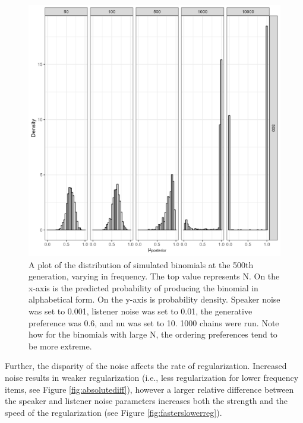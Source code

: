 \documentclass[10pt, letterpaper]{article}
\newenvironment{CodeChunk}{}{}
\begin{document}
\begin{CodeChunk}
\begin{figure}[tb]

{\centering \includegraphics[width=1\linewidth]{Figures/speaker_noise_001_listener_01} 

}

\caption[A plot of the distribution of simulated binomials at the 500th generation, varying in frequency]{A plot of the distribution of simulated binomials at the 500th generation, varying in frequency. The top value represents N. On the x-axis is the predicted probability of producing the binomial in alphabetical form. On the y-axis is probability density. Speaker noise was set to 0.001, listener noise was set to 0.01, the generative preference was 0.6, and nu was set to 10. 1000 chains were run. Note how for the binomials with large N, the ordering preferences tend to be more extreme.}\label{fig:regularizationplot1}
\end{figure}
\end{CodeChunk}

Further, the disparity of the noise affects the rate of regularization.
Increased noise results in weaker regularization (i.e., less
regularization for lower frequency items, see Figure
\ref{fig:absolutediff}), however a larger relative difference between
the speaker and listener noise parameters increases both the strength
and the speed of the regularization (see Figure
\ref{fig:fasterslowerreg}).
\end{document}
